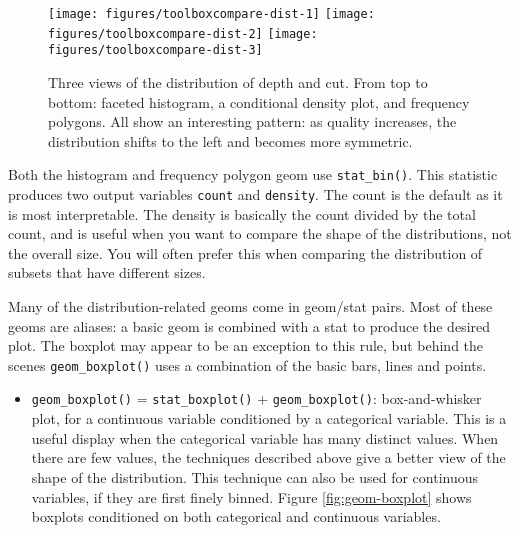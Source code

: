 \begin{figure}

{\centering \texttt{[image: figures/toolboxcompare-dist-1]} \texttt{[image: figures/toolboxcompare-dist-2]} \texttt{[image: figures/toolboxcompare-dist-3]} 

}

\caption{Three views of the distribution of depth and cut. From top to bottom: faceted histogram, a conditional density plot, and frequency polygons. All show an interesting pattern: as quality increases, the distribution shifts to the left and becomes more symmetric.\label{fig:compare-dist}}
\end{figure}

Both the histogram and frequency polygon geom use \texttt{stat\_bin()}.
This statistic produces two output variables \texttt{count} and
\texttt{density}. The count is the default as it is most interpretable.
The density is basically the count divided by the total count, and is
useful when you want to compare the shape of the distributions, not the
overall size. You will often prefer this when comparing the distribution
of subsets that have different sizes. 

Many of the distribution-related geoms come in geom/stat pairs. Most of
these geoms are aliases: a basic geom is combined with a stat to produce
the desired plot. The boxplot may appear to be an exception to this
rule, but behind the scenes \texttt{geom\_boxplot()} uses a combination
of the basic bars, lines and points.

\begin{itemize}
\itemsep1pt\parskip0pt
\item
  \texttt{geom\_boxplot()} = \texttt{stat\_boxplot()} +
  \texttt{geom\_boxplot()}: box-and-whisker plot, for a continuous
  variable conditioned by a categorical variable. This is a useful
  display when the categorical variable has many distinct values. When
  there are few values, the techniques described above give a better
  view of the shape of the distribution. This technique can also be used
  for continuous variables, if they are first finely binned. Figure
  \ref{fig:geom-boxplot} shows boxplots conditioned on both categorical
  and continuous variables.  
\end{itemize}

\begin{Shaded}
\begin{Highlighting}[]
\NormalTok{)}
\NormalTok{, }
        \NormalTok{(}\NormalTok{, }\NormalTok{))}
\end{Highlighting}
\end{Shaded}

